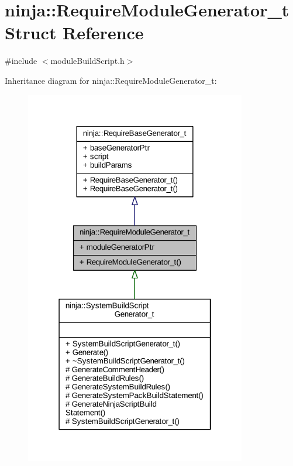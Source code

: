 \hypertarget{structninja_1_1_require_module_generator__t}{}\section{ninja\+:\+:Require\+Module\+Generator\+\_\+t Struct Reference}
\label{structninja_1_1_require_module_generator__t}


{\ttfamily \#include $<$module\+Build\+Script.\+h$>$}



Inheritance diagram for ninja\+:\+:Require\+Module\+Generator\+\_\+t\+:
\nopagebreak
\begin{figure}[H]
\begin{center}
\leavevmode
\includegraphics[width=274pt]{structninja_1_1_require_module_generator__t__inherit__graph}
\end{center}
\end{figure}


